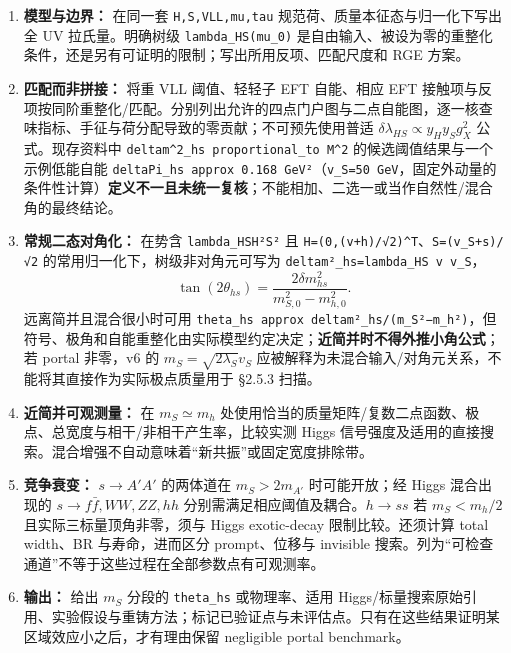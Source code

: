 \documentclass[
  chinese,
  UTF8]{ctexart}
\providecommand{\tightlist}{%
  \setlength{\itemsep}{0pt}\setlength{\parskip}{0pt}}
\begin{document}
\begin{enumerate}
\def\labelenumi{\arabic{enumi}.}
\tightlist
\item
  \textbf{模型与边界：} 在同一套 \texttt{H,S,VLL,mu,tau}
  规范荷、质量本征态与归一化下写出全 UV 拉氏量。明确树级
  \texttt{lambda\_HS(mu\_0)}
  是自由输入、被设为零的重整化条件，还是另有可证明的限制；写出所用反项、匹配尺度和
  RGE 方案。
\item
  \textbf{匹配而非拼接：} 将重 VLL 阈值、轻轻子 EFT 自能、相应 EFT
  接触项与反项按同阶重整化/匹配。分别列出允许的四点门户图与二点自能图，逐一核查味指标、手征与荷分配导致的零贡献；不可预先使用普适
  \(\delta\lambda_{HS}\propto y_Hy_Sg_X^2\) 公式。现存资料中
  \texttt{deltam\^{}2\_hs\ proportional\_to\ M\^{}2}
  的候选阈值结果与一个示例低能自能
  \texttt{\textbar{}deltaPi\_hs\textbar{}\ approx\ 0.168\ GeV²}（\texttt{v\_S=50\ GeV}，固定外动量的条件性计算）\textbf{定义不一且未统一复核}；不能相加、二选一或当作自然性/混合角的最终结论。
\item
  \textbf{常规二态对角化：} 在势含
  \texttt{lambda\_HS\textbar{}H\textbar{}²\textbar{}S\textbar{}²} 且
  \texttt{H=(0,(v+h)/√2)\^{}T}、\texttt{S=(v\_S+s)/√2}
  的常用归一化下，树级非对角元可写为
  \texttt{deltam²\_hs=lambda\_HS\ v\ v\_S}， \[
  \tan(2\theta_{hs})=\frac{2\delta m_{hs}^2}{m_{S,0}^2-m_{h,0}^2}.
  \] 远离简并且混合很小时可用
  \texttt{theta\_hs\ approx\ deltam²\_hs/(m\_S²−m\_h²)}，但符号、极角和自能重整化由实际模型约定决定；\textbf{近简并时不得外推小角公式}；若
  portal 非零，v6 的 \(m_S=\sqrt{2\lambda_S}v_S\)
  应被解释为未混合输入/对角元关系，不能将其直接作为实际极点质量用于
  §2.5.3 扫描。
\item
  \textbf{近简并可观测量：} 在 \(m_S\simeq m_h\)
  处使用恰当的质量矩阵/复数二点函数、极点、总宽度与相干/非相干产生率，比较实测
  Higgs
  信号强度及适用的直接搜索。混合增强不自动意味着``新共振''或固定宽度排除带。
\item
  \textbf{竞争衰变：} \(s\to A'A'\) 的两体道在 \(m_S>2m_{A'}\)
  时可能开放；经 Higgs 混合出现的 \(s\to f\bar f,WW,ZZ,hh\)
  分别需满足相应阈值及耦合。\(h\to ss\) 若 \(m_S<m_h/2\)
  且实际三标量顶角非零，须与 Higgs exotic-decay 限制比较。还须计算 total
  width、BR 与寿命，进而区分 prompt、位移与 invisible
  搜索。列为``可检查通道''不等于这些过程在全部参数点有可观测率。
\item
  \textbf{输出：} 给出 \(m_S\) 分段的 \texttt{theta\_hs} 或物理率、适用
  Higgs/标量搜索原始引用、实验假设与重铸方法；标记已验证点与未评估点。只有在这些结果证明某区域效应小之后，才有理由保留
  negligible portal benchmark。
\end{enumerate}
\end{document}
